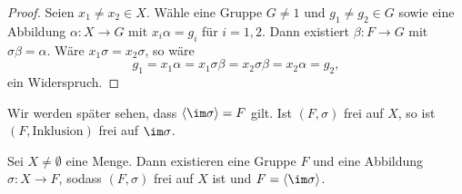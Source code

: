 \documentclass[11pt]{article}
\begin{document}
\begin{proof}
  Seien $x_1 \neq x_2 \in X$. Wähle eine Gruppe $G \neq 1$ und $g_1 \neq g_2 \in G$ sowie eine Abbildung $\alpha\colon X \to G$ mit $x_i\alpha = g_i$ für $i = 1, 2$. Dann existiert $\beta\colon F \to G$ mit $\sigma\beta = \alpha$. Wäre $x_1\sigma = x_2\sigma$, so wäre
  \[ g_1 = x_1\alpha = x_1\sigma\beta = x_2\sigma\beta = x_2\alpha = g_2, \]
  ein Widerspruch.
\end{proof}


Wir werden später sehen, dass $\langle \im\sigma \rangle = F$ gilt.
Ist $(F, \sigma)$ frei auf $X$, so ist $(F, \text{Inklusion})$ frei auf $\im\sigma$.

\begin{theorem}\Theorem
  Sei $X \neq \emptyset$ eine Menge. Dann existieren eine Gruppe $F$ und eine Abbildung $\sigma\colon X \to F$, sodass $(F, \sigma)$ frei auf $X$ ist und $F = \langle \im\sigma \rangle$.
\end{theorem}
\end{document}
